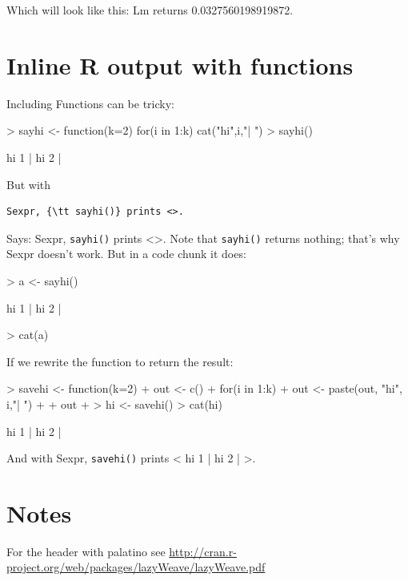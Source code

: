 \documentclass[a4paper]{report}
\begin{document}
Which will look like this: Lm returns 0.0327560198919872.

\section{Inline R output with functions}
Including Functions can be tricky:
\begin{Schunk}
\begin{Sinput}
> sayhi <- function(k=2) {for(i in 1:k) cat("hi",i,"| ") }
> sayhi()
\end{Sinput}
\begin{Soutput}
hi 1 | hi 2 | 
\end{Soutput}
\end{Schunk}

But with 
\begin{verbatim}
Sexpr, {\tt sayhi()} prints <>.
\end{verbatim}

Says: Sexpr, {\tt sayhi()} prints <>.
Note that {\tt sayhi()} returns nothing; that's why Sexpr doesn't work.  But in a code chunk it does:

\begin{Schunk}
\begin{Sinput}
> a <- sayhi()
\end{Sinput}
\begin{Soutput}
hi 1 | hi 2 | 
\end{Soutput}
\begin{Sinput}
> cat(a)
\end{Sinput}
\end{Schunk}

If we rewrite the function to return the result:

\begin{Schunk}
\begin{Sinput}
> savehi <- function(k=2) {
+   out <- c()
+   for(i in 1:k) {
+     out <- paste(out, "hi", i,"| ")
+   }
+   out
+ }
> hi <- savehi()
> cat(hi)
\end{Sinput}
\begin{Soutput}
 hi 1 |  hi 2 | 
\end{Soutput}
\end{Schunk}

And with Sexpr, {\tt savehi()} prints < hi 1 |  hi 2 | >.



\section{Notes}
For the header with palatino see 
\url{http://cran.r-project.org/web/packages/lazyWeave/lazyWeave.pdf}
\end{document}
